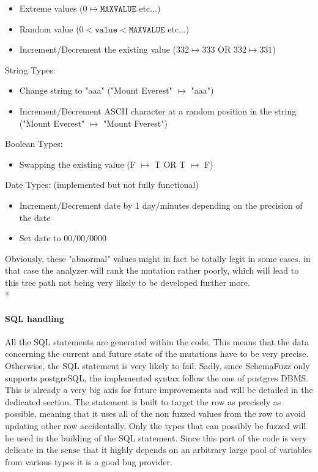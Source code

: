 \documentclass{article}
\begin{document}
\begin{empfile}
\begin{itemize}
					\item Extreme values ($0 \mapsto \texttt{MAXVALUE}$ etc...)
					\item Random value ($0<\texttt{value}<\texttt{MAXVALUE}$ etc...)
					\item Increment/Decrement the existing value ($332 \mapsto 333$ OR $332 \mapsto 331$)
				\end{itemize}
				String Types:
				\begin{itemize}
					\item Change string to "aaa" ("Mount Everest" $\mapsto$ "aaa")
					\item Increment/Decrement ASCII character at a random position in the string ("Mount Everest" $\mapsto$ "Mount Fverest")
				\end{itemize}
					Boolean Types:
				\begin{itemize}						
					\item Swapping the existing value (F $\mapsto$ T OR T $\mapsto$ F)
				\end{itemize}
					Date Types: (implemented but not fully functional)			
				\begin{itemize}
					\item Increment/Decrement date by 1 day/minutes depending on the precision of the date
					\item Set date to $00/00/0000$ 
				\end{itemize}
Obviously, these "abnormal" values might in fact be totally legit in some cases. in that case the analyzer 
will rank the mutation rather poorly, which will lead to this tree path not being very likely to be developed further more.
				\\*
				\paragraph{SQL handling}
All the SQL statements are generated within the code. This means that the data concerning the current and future state of the mutations have to be very precise. Otherwise, the SQL statement is very likely to fail. Sadly, since SchemaFuzz only supports postgreSQL, the implemented syntax follow the one of postgres
DBMS. This is already a very big axis for future improvements and will be detailed in the dedicated section.
The statement is built to target the row as precisely as possible, meaning that it uses all of the non fuzzed values from the row to avoid updating other row accidentally. Only the types that can possibly be fuzzed will be used in the building of the SQL statement. Since this part of the code is very delicate in the sense that it highly depends on an arbitrary large pool of variables from various types it is a good bug provider. 
				

\end{empfile}
\end{document}
